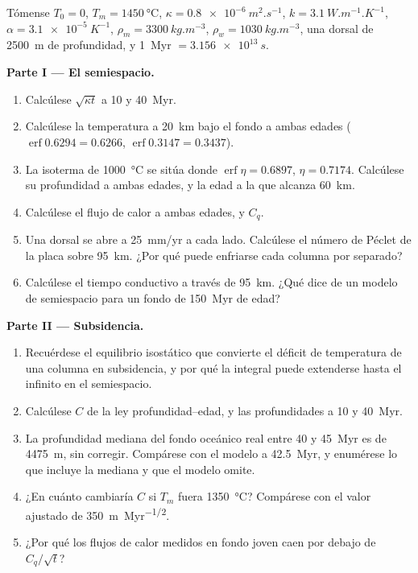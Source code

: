 \begin{problem}
\label{pb:b3:lithosphere-thermal-models:1}
Tómense $T_0 = 0$, $T_m = \qty{1450}{\celsius}$, $\kappa =
\qty{0.8e-6}{m^2.s^{-1}}$, $k = \qty{3.1}{W.m^{-1}.K^{-1}}$, $\alpha =
\qty{3.1e-5}{K^{-1}}$, $\rho_m = \qty{3300}{kg.m^{-3}}$, $\rho_w =
\qty{1030}{kg.m^{-3}}$, una dorsal de \qty{2500}{m} de profundidad, y \qty{1}{Myr} $=
\qty{3.156e13}{s}$.

\medskip\noindent\textbf{Parte I --- El semiespacio.}
\begin{enumerate}
  \item Calcúlese $\sqrt{\kappa t}$ a 10 y \qty{40}{Myr}.
  \item Calcúlese la temperatura a \qty{20}{km} bajo el fondo a ambas edades
        ($\operatorname{erf}0.6294 = 0.6266$, $\operatorname{erf}0.3147 =
        0.3437$).
  \item La isoterma de \qty{1000}{\celsius} se sitúa donde $\operatorname{erf}\eta =
        0.6897$, $\eta = 0.7174$. Calcúlese su profundidad a ambas edades, y la edad
        a la que alcanza \qty{60}{km}.
  \item Calcúlese el flujo de calor a ambas edades, y $C_q$.
  \item Una dorsal se abre a \qty{25}{mm/yr} a cada lado. Calcúlese el número de Péclet
        de la placa sobre \qty{95}{km}. ¿Por qué puede enfriarse cada columna
        por separado?
  \item Calcúlese el tiempo conductivo a través de \qty{95}{km}. ¿Qué dice de
        un modelo de semiespacio para un fondo de \qty{150}{Myr} de edad?
\end{enumerate}

\medskip\noindent\textbf{Parte II --- Subsidencia.}
\begin{enumerate}[resume]
  \item Recuérdese el equilibrio isostático que convierte el déficit de temperatura de una
        columna en subsidencia, y por qué la integral puede extenderse hasta el infinito
        en el semiespacio.
  \item Calcúlese $C$ de la ley profundidad--edad, y las profundidades a 10 y
        \qty{40}{Myr}.
  \item La profundidad mediana del fondo oceánico real entre 40 y \qty{45}{Myr}
        es de \qty{4475}{m}, sin corregir. Compárese con el modelo a
        \qty{42.5}{Myr}, y enumérese lo que incluye la mediana y que el modelo
        omite.
  \item ¿En cuánto cambiaría $C$ si $T_m$ fuera \qty{1350}{\celsius}?
        Compárese con el valor ajustado de \qty{350}{m.Myr^{-1/2}}.
  \item ¿Por qué los flujos de calor medidos en fondo joven caen por debajo de $C_q/\sqrt t$?
\end{enumerate}


\end{problem}
